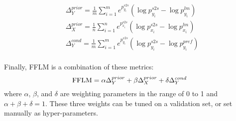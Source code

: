 \begin{equation}
	\begin{aligned}
			&\Delta_{Y}^{prior} =\frac{1}{m}\sum\nolimits_{i=1}^m  e^{p_{y_i}^{s2s}} (\log{p_{y_i}^{s2s}} - \log{p_{y_i}^{lm}}) \\
			&\Delta_{X}^{prior} =\frac{1}{n}\sum\nolimits_{i=1}^n  e^{p_{x_i}^{s2s}}(\log{p_{x_i}^{s2s}} - \log{p_{x_i}^{lm}}) \\
			&\Delta_{Y}^{cond} =\frac{1}{m}\sum\nolimits_{i=1}^m  e^{p_{y_i}^{s2s}}(\log{p_{y_i}^{s2s}} - \log{p_{y_i}^{pref}}) \\
	\end{aligned}
\end{equation}

Finally, FFLM is a combination of these metrics:
\begin{equation}
	{\rm FFLM} = \alpha \Delta_{Y}^{prior} + \beta \Delta_{X}^{prior} + \delta \Delta_{Y}^{cond}
	\label{eq:fflm}
\end{equation}
where $\alpha$, $\beta$, and $\delta$ are weighting parameters in the range 
of 0 to 1 and $\alpha+\beta+\delta=1$. These three weights can be 
tuned on a validation set, or set manually as hyper-parameters.